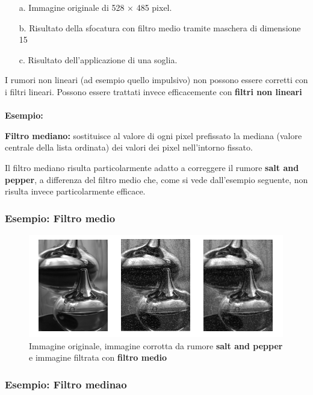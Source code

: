 \begin{enumerate}
    \item [a.] Immagine originale di 528 × 485 pixel.
    \item [b.] Risultato della sfocatura con filtro medio tramite maschera di dimensione 15
    \item [c.]  Risultato dell'applicazione di una soglia.
\end{enumerate}
I rumori non lineari (ad esempio quello impulsivo) non possono essere corretti con i filtri lineari.
Possono essere trattati invece efficacemente con \textbf{filtri non lineari}
\\\\
\textbf{Esempio:}
\begin{trivlist}
    \item \textbf{Filtro mediano:}  sostituisce al valore di ogni pixel prefissato la
    mediana (valore centrale della lista ordinata) dei
    valori dei pixel nell'intorno fissato.
\end{trivlist}
Il filtro mediano risulta particolarmente adatto a correggere il rumore \textbf{salt and pepper}, a differenza del filtro medio che, come si
vede dall'esempio seguente, non risulta invece particolarmente efficace.

\subsubsection{Esempio: Filtro medio}

\begin{figure}[H]
    \centering
    \includegraphics[width=\linewidth, keepaspectratio]{capitoli/immagini/imgs/esempio-filtro-medio.png}
    \caption*{Immagine originale, immagine corrotta da rumore \textbf{salt and pepper} e immagine filtrata con \textbf{filtro medio}}
\end{figure}

\subsubsection{Esempio: Filtro medinao}

